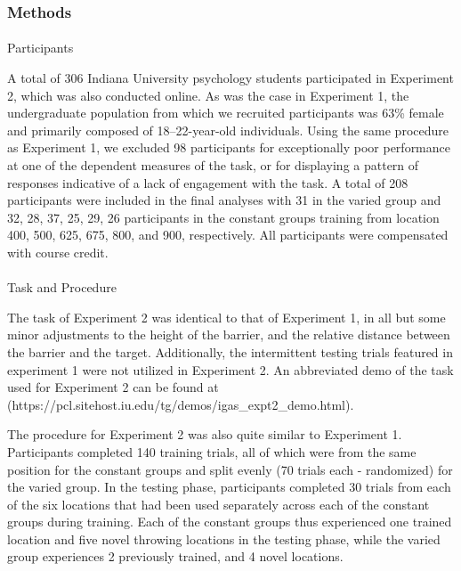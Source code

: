 \documentclass[
  11pt,
  letterpaper,
]{article}
\makeatletter
\let\oldparagraph\paragraph
\renewcommand{\paragraph}{
    \@ifstar
      \xxxParagraphStar
      \xxxParagraphNoStar
  }
\newcommand{\xxxParagraphStar}[1]{\oldparagraph*{#1}\mbox{}}
\newcommand{\xxxParagraphNoStar}[1]{\oldparagraph{#1}\mbox{}}
\makeatother
\begin{document}
\subsubsection{Methods}\label{methods-1}

\paragraph{Participants}\label{participants-1}

A total of 306 Indiana University psychology students participated in
Experiment 2, which was also conducted online. As was the case in
Experiment 1, the undergraduate population from which we recruited
participants was 63\% female and primarily composed of 18--22-year-old
individuals. Using the same procedure as Experiment 1, we excluded 98
participants for exceptionally poor performance at one of the dependent
measures of the task, or for displaying a pattern of responses
indicative of a lack of engagement with the task. A total of 208
participants were included in the final analyses with 31 in the varied
group and 32, 28, 37, 25, 29, 26 participants in the constant groups
training from location 400, 500, 625, 675, 800, and 900, respectively.
All participants were compensated with course credit.

\paragraph{Task and Procedure}\label{task-and-procedure}

The task of Experiment 2 was identical to that of Experiment 1, in all
but some minor adjustments to the height of the barrier, and the
relative distance between the barrier and the target. Additionally, the
intermittent testing trials featured in experiment 1 were not utilized
in Experiment 2. An abbreviated demo of the task used for Experiment 2
can be found at
(https://pcl.sitehost.iu.edu/tg/demos/igas\_expt2\_demo.html).

The procedure for Experiment 2 was also quite similar to Experiment 1.
Participants completed 140 training trials, all of which were from the
same position for the constant groups and split evenly (70 trials each -
randomized) for the varied group. In the testing phase, participants
completed 30 trials from each of the six locations that had been used
separately across each of the constant groups during training. Each of
the constant groups thus experienced one trained location and five novel
throwing locations in the testing phase, while the varied group
experiences 2 previously trained, and 4 novel locations.
\end{document}
